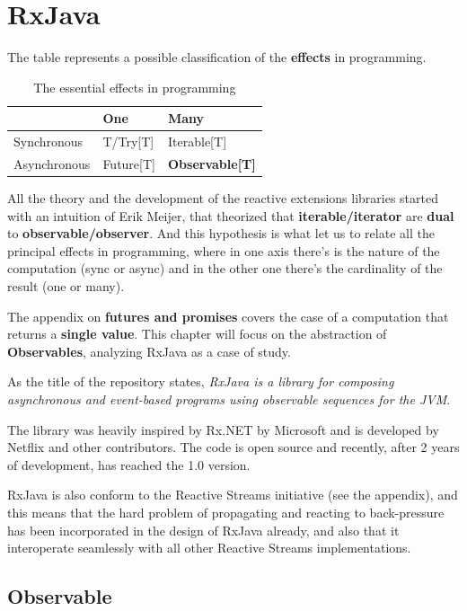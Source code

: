 \section{RxJava}\label{rxjava}

The table represents a possible classification of the
\textbf{effects} in programming.

\begin{table}[]
\centering
\caption{The essential effects in programming}
\label{my-label}
\begin{tabular}{|l|l|l|}
\hline
             & {\bf One}     & {\bf Many}        \\ \hline
Synchronous  & T/Try{[}T{]}  & Iterable{[}T{]}   \\ \hline
Asynchronous & Future{[}T{]} & \textbf{Observable{[}T{]}} \\ \hline
\end{tabular}
\end{table}

All the theory and the development of the reactive extensions libraries
started with an intuition of Erik Meijer, that theorized that
\textbf{iterable/iterator} are \textbf{dual} to
\textbf{observable/observer}. And this hypothesis is what let us to
relate all the principal effects in programming, where in one axis
there's is the nature of the computation (sync or async) and in the
other one there's the cardinality of the result (one or many).

The appendix on \textbf{futures and promises} covers the case of a
computation that returns a \textbf{single value}. This chapter will
focus on the abstraction of \textbf{Observables}, analyzing RxJava as a
case of study.

As the title of the repository states, \emph{RxJava is a library for
composing asynchronous and event-based programs using observable
sequences for the JVM}.

The library was heavily inspired by Rx.NET by Microsoft and is
developed by Netflix and other contributors. The code is open source
and recently, after 2 years of development, has reached the 1.0 version.

RxJava is also conform to the Reactive Streams initiative (see the
appendix), and this means that the hard problem of propagating and
reacting to back-pressure has been incorporated in the design of RxJava
already, and also that it interoperate seamlessly with all other
Reactive Streams implementations.

\subsection{Observable}\label{observable}

